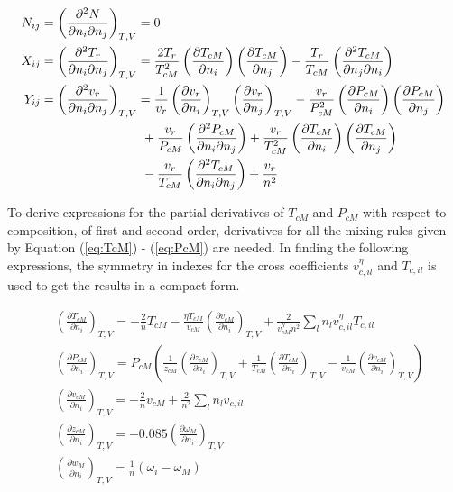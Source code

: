 \documentclass[internal,english]{sintefmemo2012}
\numberwithin{equation}{section}
\newcommand*{\pder}[2]{\left(\frac{\partial #1}{\partial #2}\right)}
\newcommand*{\pdcross}[3]{\left(\frac{\partial^2 #1}{\partial #2 \partial #3}\right)}
\newcommand*{\reff}[1]{(\ref{#1})}
\begin{document}
\begin{align}
 \phantom{Y_ij}
 \label{eq:N_ij}
 & \begin{aligned}
  \mathllap {N_{ij}} & = \pdcross{N}{n_i}{n_j}_{T,V} = 0 
  \end{aligned} \\
 \label{eq:Tr_ij}
 & \begin{aligned}
  \mathllap{X_{ij}} & = \pdcross{T_r}{n_i}{n_j}_{T,V} = \frac{2T_r}{T_{cM}^2} \pder{T_{cM}}{n_i} \pder{T_{cM}}{n_j} - \frac{T_r}{T_{cM}} \pdcross{T_{cM}}{n_j}{n_i}
  \end{aligned} \\
  \label{eq:vr_ij}
 &\begin{aligned}
  \mathllap{Y_{ij}} & = \pdcross{v_r}{n_i}{n_j}_{T,V} = \frac{1}{v_r} \pder{v_r}{n_i}_{T,V} 			    \pder{v_r}{n_j}_{T,V} - \frac{v_r}{P_{cM}^2} \pder{P_{cM}}{n_i} \pder{P_{cM}}{n_j} \\
	& \qquad  \qquad  \qquad \qquad + \frac{v_r}{P_{cM}} \pdcross{P_{cM}}{n_i}{n_j} + \frac{v_r}{T_{cM}^2} \pder{T_{cM}}{n_i} \pder{T_{cM}}{n_j} \\
	& \qquad  \qquad  \qquad \qquad - \frac{v_r}{T_{cM}} \pdcross{T_{cM}}{n_i}{n_j} + \frac{v_r}{n^2}
 \end{aligned}  
\end{align}

To derive expressions for the partial derivatives of $T_{cM} $ and $P_{cM}$ with respect to composition, of first and second order, derivatives for all the mixing rules given by Equation \reff{eq:TcM} - \reff{eq:PcM} are needed. In finding the following expressions, the symmetry in indexes for the cross coefficients $v_{c,il}^\eta$ and $T_{c,il}$ is used to get the results in a compact form.

\begin{align}
\label{eq:TcM_ni}
& \left(\frac{\partial T_{cM}}{\partial n_i} \right)_{T,V} =-\frac{2}{n}T_{cM} -\frac{\eta T_{cM}}{v_{cM}} \pder{v_{cM}}{n_i}_{T,V}+ \frac{2}{v_{cM}^{\eta} n^2} \sum_l n_l v_{c,il}^\eta T_{c,il} \\
\label{eq:PcM_ni}
& \pder{P_{cM}}{n_i}_{T,V} = P_{cM} \left(\frac{1}{z_{cM}} \pder{z_{cM}}{n_i}_{T,V} + \frac{1}{T_{cM}} \pder{T_{cM}}{n_i}_{T,V} - \frac{1}{v_{cM}} \pder{v_{cM}}{n_i}_{T,V} \right) \\
\label{eq:vcM_ni}
& \left(\frac{\partial v_{cM}}{\partial n_i} \right)_{T,V} = -\frac{2}{n}v_{cM} + \frac{2}{n^2} \sum_l n_l v_{c,il}\\
\label{eq:zcM_ni}
& \pder{z_{cM}}{n_i}_{T,V} = -0.085 \pder{\omega_M}{n_i}_{T,V} \\
\label{eq:wM_ni}
& \left(\frac{\partial w_{M}}{\partial n_i} \right)_{T,V} = \frac{1}{n} (\omega_i - \omega_M)
\end{align}
\end{document}
